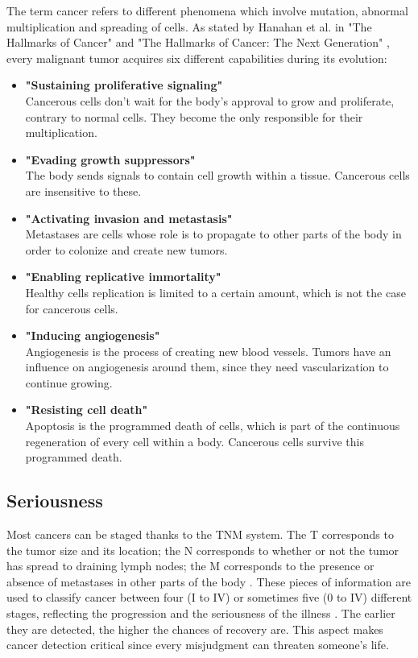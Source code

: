 The term cancer refers to different phenomena which involve mutation, abnormal multiplication and spreading of cells. As stated by Hanahan et al. in "The Hallmarks of Cancer" \cite{19} and "The Hallmarks of Cancer: The Next Generation" \cite{20}, every malignant tumor acquires six different capabilities during its evolution: 
\begin{itemize}
	\item \textbf{"Sustaining proliferative signaling"}\\ Cancerous cells don't wait for the body's approval to grow and proliferate, contrary to normal cells. They become the only responsible for their multiplication.
	\item \textbf{"Evading growth suppressors"}\\
The body sends signals to contain cell growth within a tissue. Cancerous cells are insensitive to these. 
	\item \textbf{"Activating invasion and metastasis"}\\
Metastases are cells whose role is to propagate to other parts of the body in order to colonize and create new tumors. 
	\item \textbf{"Enabling replicative immortality"}\\
Healthy cells replication is limited to a certain amount, which is not the case for cancerous cells. 
	\item \textbf{"Inducing angiogenesis"}
\\Angiogenesis is the process of creating new blood vessels. Tumors have an influence on angiogenesis around them, since they need vascularization to continue growing. 
	\item \textbf{"Resisting cell death"}
\\Apoptosis is the programmed death of cells, which is part of the continuous regeneration of every cell within a body. Cancerous cells survive this programmed death. 
	
\end{itemize}


\subsection{Seriousness}

Most cancers can be staged thanks to the TNM system. The T corresponds to the tumor size and its location; the N corresponds to whether or not the tumor has spread to draining lymph nodes; the M corresponds to the presence or absence of metastases in other parts of the body \cite{21}. These pieces of information are used to classify cancer between four (I to IV) or sometimes five (0 to IV) different stages, reflecting the progression and the seriousness of the illness \cite{22}. The earlier they are detected, the higher the chances of recovery are. This aspect makes cancer detection critical since every misjudgment can threaten someone's life. 

